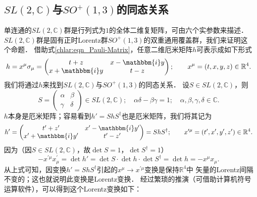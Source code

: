 \subsection{$SL(2,\mathbb{C})$与$SO^{+}(1,3)$的同态关系} \label{chlar:sec_slsoh}
单连通的$SL(2,\mathbb{C})$群是行列式为$1$的全体二维复矩阵，可由六个实参数来描述．
$SL(2,\mathbb{C})$群是固有正时Lorentz群$SO^{+}(1,3)$的双重通用覆盖群，我们来证明这个命题．
借助式\eqref{chlar:eqn_Pauli-Matrix}，任意二维厄米矩阵$h$可表示成如下形式
\begin{equation}\label{chlar:eqn_hslso}
    h = x^\mu \sigma_\mu
    =\begin{pmatrix}
        t+z & x- \mathbbm{i} y \\ x+ \mathbbm{i} y & t-z
    \end{pmatrix}; 
    \qquad x^\mu= (t,x,y,z) \in \mathbb{R}^4 .
\end{equation}
我们将通过$h$来找到$SL(2,\mathbb{C})$与$SO^{+}(1,3)$的同态关系．
设$S\in SL(2,\mathbb{C})$，则
\begin{equation}\label{chlar:eqn_sl2}
    S=\begin{pmatrix} \alpha & \beta \\ \gamma & \delta \end{pmatrix} \in SL(2,\mathbb{C}) ; 
    \quad \alpha \delta - \beta \gamma =1; 
    \quad \alpha , \beta ,\gamma , \delta \in \mathbb{C} .
\end{equation}
$h$本身是厄米矩阵；容易看到$h'=ShS^\dagger$也是厄米矩阵，我们将其记为
\begin{equation}\label{chlar:eqn_hpslso}
    h' =\begin{pmatrix}
        t'+z' & x'- \mathbbm{i} y' \\ x'+ \mathbbm{i} y' &   t'-z'
    \end{pmatrix} =ShS^\dagger; 
    \qquad x^{\prime\mu}= (t',x',y',z') \in \mathbb{R}^4 .
\end{equation}
因为（因$S\in SL(2,\mathbb{C})$，故$\det S=1$，$\det S^\dagger=1$）
\begin{equation}\label{chlar:eqn_hx}
    -x^{\prime\mu} x^{\prime}_\mu=\det h' = \det S \cdot \det h \cdot \det S^\dagger = \det h = -x^{\mu}x_\mu .
\end{equation}
从上式可知，因变换$h'=ShS^\dagger$引起的$x^\mu \to x^{\prime\mu}$变换是保持$\mathbb{R}^4$中
矢量的Lorentz间隔不变的；这也就说明此变换是Lorentz变换．
经过繁琐的推演（可借助计算机符号运算软件），可以得到这个Lorentz变换如下：
